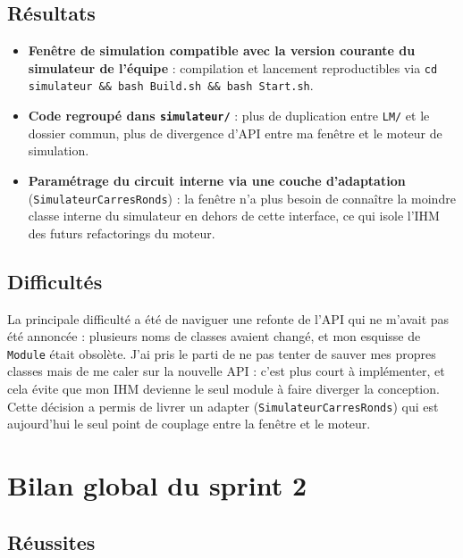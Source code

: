 \documentclass[11pt,a4paper]{article}
\begin{document}
\subsection*{R\'esultats}

\begin{itemize}
  \item \textbf{Fen\^etre de simulation compatible avec la version courante du simulateur de l'\'equipe} : compilation et lancement reproductibles via \texttt{cd simulateur \&\& bash Build.sh \&\& bash Start.sh}.
  \item \textbf{Code regroup\'e dans \texttt{simulateur/}} : plus de duplication entre \texttt{LM/} et le dossier commun, plus de divergence d'API entre ma fen\^etre et le moteur de simulation.
  \item \textbf{Param\'etrage du circuit interne via une couche d'adaptation} (\texttt{SimulateurCarres\-Ronds}) : la fen\^etre n'a plus besoin de connaître la moindre classe interne du simulateur en dehors de cette interface, ce qui isole l'IHM des futurs refactorings du moteur.
\end{itemize}

\subsection*{Difficult\'es}

La principale difficult\'e a \'et\'e de naviguer une refonte de l'API qui ne m'avait pas \'et\'e annonc\'ee : plusieurs noms de classes avaient chang\'e, et mon esquisse de \texttt{Module} \'etait obsol\`ete. J'ai pris le parti de ne pas tenter de sauver mes propres classes mais de me caler sur la nouvelle API : c'est plus court \`a impl\'ementer, et cela \'evite que mon IHM devienne le seul module \`a faire diverger la conception. Cette d\'ecision a permis de livrer un \og adapter \fg{} (\texttt{SimulateurCarresRonds}) qui est aujourd'hui le seul point de couplage entre la fen\^etre et le moteur.

\section*{Bilan global du sprint 2}

\subsection*{R\'eussites}
\end{document}

